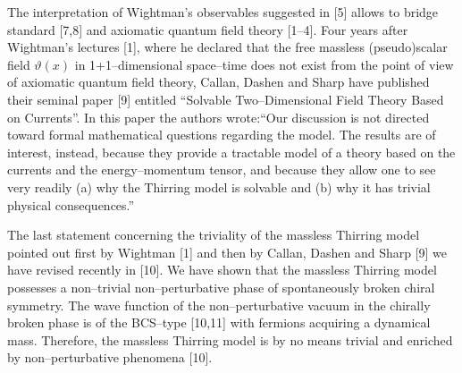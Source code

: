 \documentclass[a4paper,12pt] {article}
\begin{document}
The interpretation of Wightman's observables suggested in [5] allows
to bridge standard [7,8] and axiomatic quantum field theory
[1--4]. Four years after Wightman's lectures [1], where he declared
that the free massless (pseudo)scalar field $\vartheta(x)$ in
1+1--dimensional space--time does not exist from the point of view of
axiomatic quantum field theory,  Callan, Dashen and Sharp have
published their seminal paper [9] entitled ``Solvable Two--Dimensional
Field Theory Based on Currents''. In this paper the authors
wrote:``Our discussion is not directed toward formal mathematical
questions regarding the model. The results are of interest, instead,
because they provide a tractable model of a theory based on the
currents and the energy--momentum tensor, and because they allow one
to see very readily (a) why the Thirring model is solvable and (b) why
it has trivial physical consequences.''

The last statement concerning the triviality of the massless Thirring
model pointed out first by Wightman [1] and then by Callan, Dashen and
Sharp [9] we have revised recently in [10]. We have shown that the
massless Thirring model possesses a non--trivial non--perturbative
phase of spontaneously broken chiral symmetry. The wave function of
the non--perturbative vacuum in the chirally broken phase is of the
BCS--type [10,11] with fermions acquiring a dynamical mass. Therefore,
the massless Thirring model is by no means trivial and enriched by
non--perturbative phenomena [10].
\end{document}
